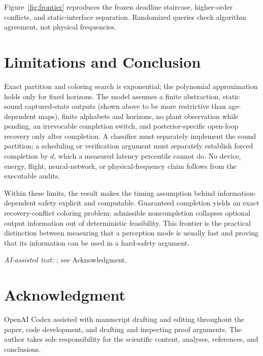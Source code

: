 \documentclass[letterpaper,10pt,conference]{ieeeconf}
\begin{document}
Figure~\ref{fig:frontier} reproduces the frozen deadline staircase, higher-order conflicts, and
static-interface separation. Randomized queries check algorithm agreement, not physical frequencies.

\section{Limitations and Conclusion}

Exact partition and coloring search is exponential; the polynomial approximation holds only for
fixed horizons. The model assumes a finite abstraction, static
sound captured-state outputs (shown above to be more restrictive than age-dependent maps), finite
alphabets and horizons, no plant observation while pending, an irrevocable completion switch, and
posterior-specific open-loop recovery only after completion. A classifier must separately
implement the sound partition; a scheduling or verification argument must separately establish
forced completion by $d$, which a measured latency percentile cannot do. No device, energy,
flight, neural-network, or physical-frequency claim follows from the executable audits.

Within these limits, the result makes the timing assumption behind information-dependent safety
explicit and computable. Guaranteed completion yields an exact recovery-conflict coloring problem;
admissible noncompletion collapses optional output information out of deterministic feasibility.
This frontier is the practical distinction between measuring that a perception mode is usually
fast and proving that its information can be used in a hard-safety argument.

\noindent\textit{AI-assisted text:} \cite{openai2026codex}; see Acknowledgment.

\section*{Acknowledgment}
OpenAI Codex assisted with manuscript drafting and editing throughout the paper, code
development, and drafting and inspecting proof arguments. The author takes sole responsibility
for the scientific content, analyses, references, and conclusions.


\raggedend
\raggedbottom
{}\relax
\IEEEtriggercmd{\newpage}

\end{document}
